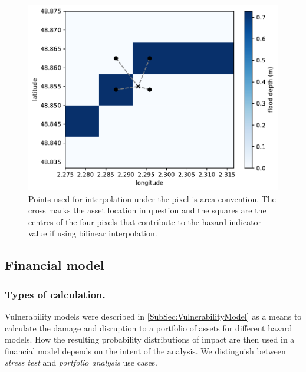 \documentclass[a4paper,11pt]{extarticle} %
\theoremstyle{definition}
\begin{document}
\begin{figure}[ht]

    \begin{framed}
        \includegraphics[clip, trim=0cm 0cm 0cm 0cm, width=1.00\textwidth]{plots/interp_pixel_is_area.pdf}

    \end{framed}

    \footnotesize

    \renewcommand{\arraystretch}{1.01}

    \vspace{-3ex}

    \vspace{-0.5ex}

    \caption{\small Points used for interpolation under the pixel-is-area convention. The cross marks the asset location in question and the squares are the centres of the four pixels that contribute to the hazard indicator value if using bilinear interpolation.}
    \label{Fig:interp_pixel_is_area}

\end{figure}


\subsection{Financial model}

\subsubsection{Types of calculation.}
Vulnerability models were described in \ref{SubSec:VulnerabilityModel} as a means to calculate the damage and disruption to a portfolio of assets for different hazard models. How the resulting probability distributions of impact are then used in a financial model depends on the intent of the analysis. We distinguish between \emph{stress test} and \emph{portfolio analysis} use cases.
\end{document}
